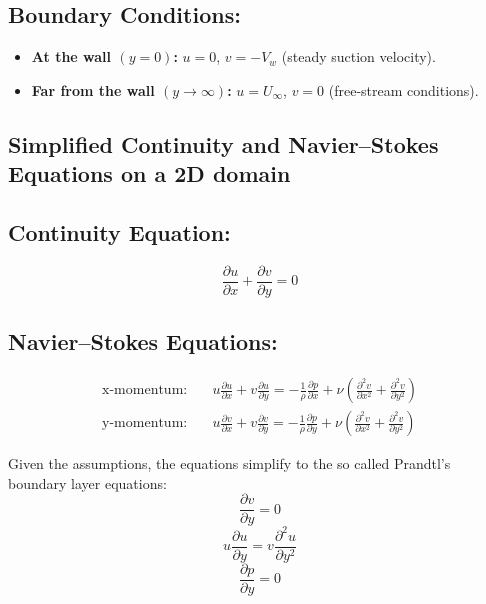 \documentclass{article}
\begin{document}
\subsection{Boundary Conditions:}
\begin{itemize}
    \item \textbf{At the wall \((y = 0)\):} \(u = 0\), \(v = -V_w\) (steady suction velocity).
    \item \textbf{Far from the wall \((y \rightarrow \infty)\):} \(u = U_\infty\), \(v = 0\) (free-stream conditions).
\end{itemize}

\subsection{Simplified Continuity and Navier–Stokes Equations on a 2D domain}

\subsection{Continuity Equation:}
\[
\frac{\partial u}{\partial x} + \frac{\partial v}{\partial y} = 0
\]

\subsection{Navier–Stokes Equations:}
\begin{align*}
    \text{x-momentum:} & \quad u \frac{\partial u}{\partial x} + v \frac{\partial u}{\partial y} = -\frac{1}{\rho} \frac{\partial p}{\partial x} + \nu (\frac{\partial^2 v}{\partial x^2}+\frac{\partial^2 v}{\partial y^2}) \\
    \text{y-momentum:} & \quad u \frac{\partial v}{\partial x} + v \frac{\partial v}{\partial y} = -\frac{1}{\rho} \frac{\partial p}{\partial y} + \nu (\frac{\partial^2 v}{\partial x^2}+\frac{\partial^2 v}{\partial y^2})
\end{align*}

Given the assumptions, the equations simplify to the so called Prandtl's boundary layer equations:
\[
\frac{\partial v}{\partial y} = 0
\]
\[
u \frac{\partial u}{\partial y} = v \frac{\partial^2 u}{\partial y^2}
\]
\[
\frac{\partial p}{\partial y} = 0
\]
\end{document}
